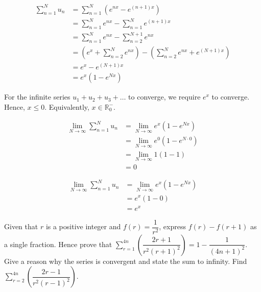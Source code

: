 \documentclass{jhwhw}
\begin{document}
    \solution
        \begin{align*}
            \sum\limits_{n=1}^N u_n &= \sum\limits_{n=1}^N \left(e^{nx} - e^{(n+1)x}\right)\\
            &= \sum_{n=1}^N e^{nx} - \sum_{n=1}^N e^{(n+1)x}\\
            &= \sum_{n=1}^N e^{nx} - \sum_{n=2}^{N+1} e^{nx}\\
            &= \left(e^x + \sum_{n=2}^N e^{nx}\right) - \left(\sum_{n=2}^{N} e^{nx} + e^{(N+1)x}\right)\\
            &= e^x - e^{(N+1)x}\\
            &= e^x(1 - e^{Nx})
        \end{align*}


        For the infinite series $u_1 + u_2 + u_3 + \ldots$ to converge, we require $e^x$ to converge. Hence, $x \leq 0$. Equivalently, $x \in \mathbb{R}^-_0$.


        \begin{align*}
            \lim_{N \rightarrow \infty} \sum\limits_{n=1}^N u_n &= \lim_{N \rightarrow \infty} e^x(1 - e^{Nx}) \\
            &= \lim_{N \rightarrow \infty} e^0(1 - e^{N\cdot0}) \\
            &= \lim_{N \rightarrow \infty} 1(1 - 1) \\
            &= 0
        \end{align*}


        \begin{align*}
            \lim_{N \rightarrow \infty} \sum\limits_{n=1}^N u_n &= \lim_{N \rightarrow \infty} e^x(1 - e^{Nx}) \\
            &= e^x(1 - 0)\\
            &= e^x
        \end{align*}


    \problem{}
        Given that $r$ is a positive integer and $f(r) = \dfrac1{r^2}$, express $f(r) - f(r+1)$ as a single fraction. Hence prove that $\sum\limits_{r=1}^{4n} \left(\dfrac{2r+1}{r^2(r+1)^2}\right) = 1 - \dfrac1{(4n+1)^2}$. Give a reason why the series is convergent and state the sum to infinity. Find $\sum\limits_{r=2}^{4n} \left(\dfrac{2r-1}{r^2(r-1)^2}\right)$.
\end{document}
